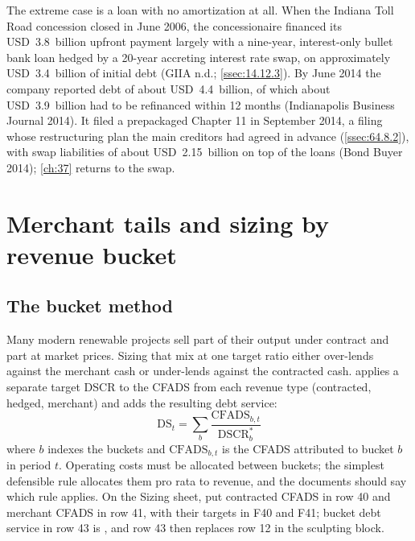 The extreme case is a loan with no amortization at all. When the Indiana Toll Road concession closed in June 2006, the concessionaire financed its USD~3.8~billion upfront payment largely with a nine-year, interest-only bullet bank loan hedged by a 20-year accreting interest rate swap, on approximately USD~3.4~billion of initial debt (GIIA n.d.; \cref{ssec:14.12.3}). By June 2014 the company reported debt of about USD~4.4~billion, of which about USD~3.9~billion had to be refinanced within 12 months (Indianapolis Business Journal 2014). It filed a prepackaged Chapter 11 in September 2014, a filing whose restructuring plan the main creditors had agreed in advance (\cref{ssec:64.8.2}), with swap liabilities of about USD~2.15~billion on top of the loans (Bond Buyer 2014); \cref{ch:37} returns to the swap.

\section{Merchant tails and sizing by revenue bucket}\label{sec:36.8}

\subsection{The bucket method}\label{ssec:36.8.1}

Many modern renewable projects sell part of their output under contract and part at market prices. Sizing that mix at one target ratio either over-lends against the merchant cash or under-lends against the contracted cash.  applies a separate target DSCR to the CFADS from each revenue type (contracted, hedged, merchant) and adds the resulting debt service:
\begin{equation}\label{eq:36.6}
\mathrm{DS}_t = \sum_{b} \frac{\mathrm{CFADS}_{b,t}}{\mathrm{DSCR}^{*}_b}
\end{equation}
where $b$ indexes the buckets and $\mathrm{CFADS}_{b,t}$ is the CFADS attributed to bucket $b$ in period $t$. Operating costs must be allocated between buckets; the simplest defensible rule allocates them pro rata to revenue, and the documents should say which rule applies. On the Sizing sheet, put contracted CFADS in row 40 and merchant CFADS in row 41, with their targets in F40 and F41; bucket debt service in row 43 is , and row 43 then replaces row 12 in the sculpting block.


